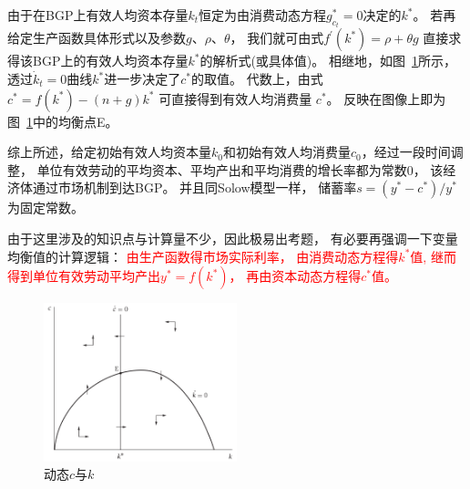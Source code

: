 \documentclass[cn,normal,11pt,black]{elegantnote}
\begin{document}
    由于在BGP上有效人均资本存量$k_t$恒定为由消费动态方程$g_{c_t}^*=0$决定的$k^*$。
    若再给定生产函数具体形式以及参数$g$、$\rho$、$\theta$，
    我们就可由式$f^\prime(k^*) = \rho + \theta g$
    直接求得该BGP上的有效人均资本存量$k^*$的解析式(或具体值)。
    相继地，如图~\ref{ramseyequipoint}所示，透过$\dot{k}_t = 0$曲线$k^*$进一步决定了$c^*$的取值。
    代数上，由式 $c^*=f(k^*)-(n+g)k^*$ 可直接得到有效人均消费量 $c^*$。
    反映在图像上即为图~\ref{ramseyequipoint}中的均衡点E。

    综上所述，给定初始有效人均资本量$k_0$和初始有效人均消费量$c_0$，经过一段时间调整，
    单位有效劳动的平均资本、平均产出和平均消费的增长率都为常数0，
    该经济体通过市场机制到达BGP。
    并且同Solow模型一样，
    储蓄率$ s= (y^* - c^*)/ y^*$为固定常数。

\begin{note}[计算逻辑]
    由于这里涉及的知识点与计算量不少，因此极易出考题，
    有必要再强调一下变量均衡值的计算逻辑：
    \textcolor{red}{
    由生产函数得市场实际利率，
    由消费动态方程得$k^*$值,
    继而得到单位有效劳动平均产出$y^* = f(k^*)$，
    再由资本动态方程得$c^*$值。}
\end{note}

\begin{figure}[!htbp]
    \centering
    \includegraphics[width=0.5\textwidth]{image/r3.png}
    \caption{动态$c$与$k$}     \label{ramseyequipoint}
\end{figure}
\end{document}
